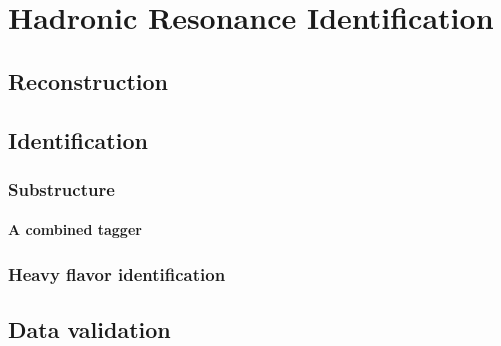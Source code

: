 \chapter{Hadronic Resonance Identification}

\section{Reconstruction}

\section{Identification}

\subsection{Substructure}

\subsubsection{A combined tagger}

\subsection{Heavy flavor identification}

\section{Data validation}
